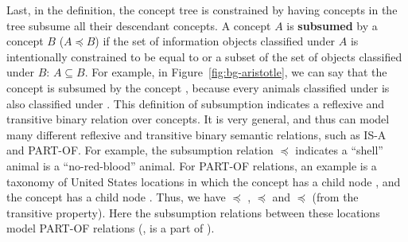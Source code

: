 Last, in the definition, the concept tree is constrained by having concepts in the tree subsume all their descendant concepts. A concept $A$ is \textbf{subsumed} by a concept $B$ ($A \preccurlyeq B$) if the set of information objects classified under $A$ is intentionally constrained to be equal to or a subset of the set of objects classified under $B$: $A \subseteq B$. For example, in Figure~\ref{fig:bg-aristotle}, we can say that the concept  is subsumed by the concept , because every animals classified under  is also classified under . This definition of subsumption indicates a reflexive and transitive binary relation over concepts. It is very general, and thus can model many different reflexive and transitive binary semantic relations, such as IS-A and PART-OF. For example, the subsumption relation  $\preccurlyeq$  indicates a ``shell'' animal is a ``no-red-blood'' animal. For PART-OF relations, 
an 
example is a taxonomy of United States locations in which the concept  has a child node , and the concept  has a child node . Thus, we have  $\preccurlyeq$ ,   $\preccurlyeq$  and  $\preccurlyeq$  (from the transitive property). Here the subsumption relations between these locations model PART-OF relations (\eg,  is a part of ).




